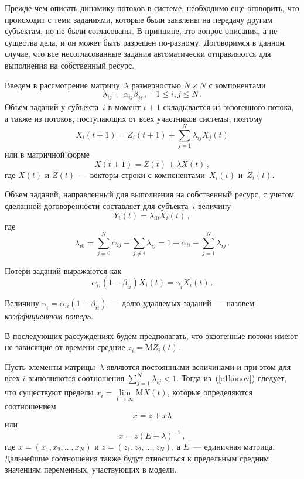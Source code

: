 \begin{multicols}{2}
  Прежде чем описать динамику потоков в системе, необходимо еще оговорить, что 
происходит с теми заданиями, которые были заявлены на передачу другим субъектам, но не 
были согласованы. В принципе, это вопрос описания, а не существа дела, и он может быть 
разрешен по-разному. Договоримся в данном случае, что все несогласованные задания 
автоматически отправляются для выполнения на собственный ресурс.
  
  Введем в рассмотрение матрицу~$\lambda$ размерностью $N\times N$ с компонентами
  $$
  \lambda_{ij} =\alpha_{ij}\beta_{ji}\,,\quad 1\leq i,j\leq N\,.
  $$
Объем заданий у субъекта~$i$ в момент $t+1$ складывается из экзогенного потока, а также из 
потоков, поступающих от всех участников системы, поэтому
  $$
  X_i(t+1)=Z_i(t+1)+\sum\limits_{j=1}^N \lambda_{ij}X_j(t)
  $$
или в матричной форме
\begin{equation}
X(t+1)=Z(t)+\lambda X(t)\,,
\label{e1konov}
\end{equation}
где $X(t)$ и $Z(t)$~--- векторы-строки с компонентами~$X_i(t)$ и~$Z_i(t)$.
  
  Объем заданий, направленный для выполнения на собственный ресурс, с учетом 
сделанной договоренности составляет для субъекта~$i$ величину
  \begin{equation*}
  Y_i(t) =\lambda_{i0}X_i(t)\,,
  \end{equation*}
где 
$$
\lambda_{i0} =\sum\limits_{j=0}^N\alpha_{ij}-\sum\limits_{j\not= i}\lambda_{ij}=1-\alpha_{ii}-
\sum\limits_{j=1}^N \lambda_{ij}\,.
$$
  
  Потери заданий выражаются как
  \begin{equation}
  \alpha_{ii}(1-\beta_{ii})X_i(t)=\gamma_iX_i(t)\,.
  \label{e3konov}
  \end{equation}

  Величину $\gamma_i =\alpha_{ii}(1-\beta_{ii})$~--- долю удаляемых заданий~--- назовем 
\textit{коэффициентом потерь}.
  
  В последующих рассуждениях будем предполагать, что экзогенные потоки имеют не 
зависящие от времени средние $z_i = \mathrm{M}Z_i(t)$.
  
  Пусть элементы матрицы~$\lambda$ являются постоянными величинами и при этом для 
всех $i$ выполняются соотношения $\sum\limits_{j=1}^N \lambda_{ij}<1$. Тогда 
из~(\ref{e1konov}) следует, что существуют пределы 
$x_i=\lim\limits_{t\rightarrow\infty} \mathrm{M} X(t)$, которые определяются соотношением
  \begin{equation}
  x=z+x\lambda
  \label{e4konov}
  \end{equation}
или
$$
x=z(E-\lambda)^{-1}\,,
$$
где $x=(x_1,x_2,\ldots ,x_N)$ и $z=(z_1,z_2,\ldots ,z_N)$, а $E$~--- единичная матрица. 
Дальнейшие соотношения также будут относиться к предельным средним значениям 
переменных, участвующих в модели.


\end{multicols}
